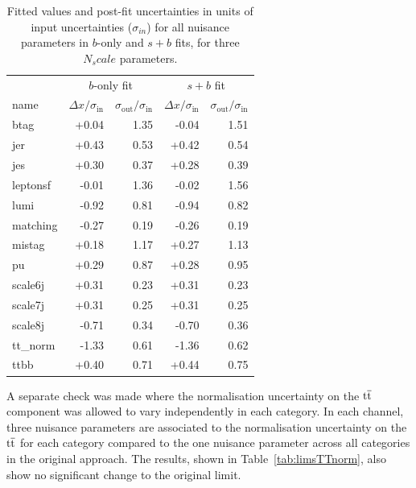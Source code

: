 \begin{table}[ht!]
\centering
\small
\begin{tabular}{|l|r|r|r|r|} \hline 
 &  \multicolumn{2}{c|}{$b$-only fit } & \multicolumn{2}{c|}{$s+b$ fit} \\
name        &  $\Delta x/\sigma_{\text{in}}$ & $\sigma_{\text{out}}/\sigma_{\text{in}}$ & $\Delta x/\sigma_{\text{in}}$ &$\sigma_{\text{out}}/\sigma_{\text{in}}$  \\  \hline
btag          &    +0.04& 1.35 & -0.04& 1.51 \\
jer             &      +0.43& 0.53 &     +0.42& 0.54 \\
jes            &   +0.30& 0.37 &  +0.28& 0.39  \\
leptonsf    &      -0.01& 1.36 &  -0.02& 1.56 \\
lumi          &      -0.92& 0.81 &     -0.94& 0.82  \\
matching  &   -0.27& 0.19 &  -0.26& 0.19  \\
mistag      &      +0.18& 1.17 &     +0.27& 1.13  \\
pu            &      +0.29& 0.87 &     +0.28& 0.95  \\
scale6j     &   +0.31& 0.23 &  +0.31& 0.23  \\
scale7j     &   +0.31& 0.25 &  +0.31& 0.25  \\
scale8j     &   -0.71& 0.34 &  -0.70& 0.36  \\
tt\_norm   &      -1.33& 0.61 &     -1.36& 0.62  \\
ttbb          &      +0.40& 0.71 &     +0.44& 0.75  \\
 \hline
\end{tabular}
\vspace{-0.2cm}
\caption{Fitted values and post-fit uncertainties in units of input uncertainties ($\sigma_{in}$) for all nuisance parameters in $b$-only and $s+b$ fits, for three $N_scale$ parameters.}
\label{tab:ScaleParamUnc}
\end{table}

A separate check was made where the normalisation uncertainty on the $\mathrm{t}\overline{\mathrm{t}}$ component was allowed to vary independently in each  \njets category. In each channel, three nuisance parameters are associated to the normalisation uncertainty on the $\mathrm{t}\overline{\mathrm{t}}$ for each \njets category compared to the one nuisance parameter across all \njets categories in the original approach. The results, shown in Table~\ref{tab:limsTTnorm}, also show no significant change to the original limit.

